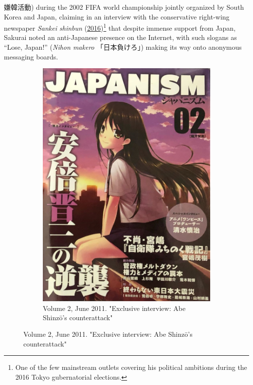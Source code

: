 \documentclass[10pt,british,A4paper,twoside]{memoir}
\begin{document}
嫌韓活動) during the 2002 FIFA world championship jointly organized by
South Korea and Japan, claiming in an interview with the conservative
right-wing newspaper \emph{Sankei shinbun}
(\protect\hyperlink{ref-sankei_news__2016}{2016})\footnote{One of the
  few mainstream outlets covering his political ambitions during the
  2016 Tokyo gubernatorial elections.} that despite immense support from
Japan, Sakurai noted an anti-Japanese presence on the Internet, with
such slogans as ``Lose, Japan!'' (\emph{Nihon makero} 「日本負けろ」)
making its way onto anonymous messaging boards.

\begin{figure}[!htb]
 \centering
 \begin{subfigure}[b]{0.30\textwidth}
 \includegraphics[width=\textwidth]{images/japanism1.jpg}
 \caption{Volume 2, June 2011. "Exclusive interview: Abe Shinzō’s counterattack"}
 \label{fig:japanism1}
 \end{subfigure}

\end{figure}
\end{document}

